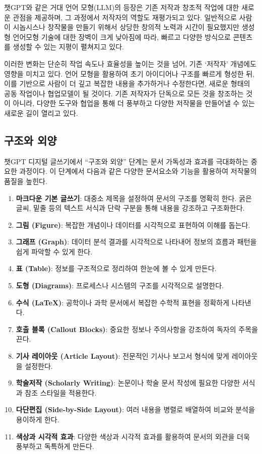 \documentclass[
  letterpaper,
]{book}
\providecommand{\tightlist}{%
  \setlength{\itemsep}{0pt}\setlength{\parskip}{0pt}}\usepackage{longtable,booktabs,array}
\begin{document}
챗GPT와 같은 거대 언어 모형(LLM)의 등장은 기존 저작과 창조적 작업에 대한
새로운 관점을 제공하며, 그 과정에서 저작자의 역할도 재평가되고 있다.
일반적으로 사람이 시놉시스나 창작물을 만들기 위해서 상당한 창의적 노력과
시간이 필요했지만 생성형 언어모형 기술에 대한 장벽이 크게 낮아짐에 따라,
빠르고 다양한 방식으로 콘텐츠를 생성할 수 있는 지평이 펼쳐지고 있다.

이러한 변화는 단순히 작업 속도나 효율성을 높이는 것을 넘어, 기존
`저작자' 개념에도 영향을 미치고 있다. 언어 모형을 활용하여 초기
아이디어나 구조를 빠르게 형성한 뒤, 이를 기반으로 사람이 더 깊고 복잡한
내용을 추가하거나 수정한다면, 새로운 형태의 공동 작업이나 협업모델이 될
것이다. 기존 저작자가 단독으로 모든 것을 창조하는 것이 아니라, 다양한
도구와 협업을 통해 더 풍부하고 다양한 저작물을 만들어낼 수 있는 새로운
길이 열리고 있다.

\hypertarget{uxad6cuxc870uxc640-uxc678uxc591}{%
\subsection{구조와 외양}\label{uxad6cuxc870uxc640-uxc678uxc591}}

챗GPT 디지털 글쓰기에서 ``구조와 외양'' 단계는 문서 가독성과 효과를
극대화하는 중요한 과정이다. 이 단계에서 다음과 같은 다양한 문서요소와
기능을 활용하여 저작물의 품질을 높힌다.

\begin{enumerate}
\def\labelenumi{\arabic{enumi}.}
\tightlist
\item
  \textbf{마크다운 기본 글쓰기}: 대중소 제목을 설정하여 문서의 구조를
  명확히 한다. 굵은 글씨, 밑줄 등의 텍스트 서식과 단락 구분을 통해
  내용을 강조하고 구조화한다.
\item
  \textbf{그림 (Figure)}: 복잡한 개념이나 데이터를 시각적으로 표현하여
  이해를 돕는다.
\item
  \textbf{그래프 (Graph)}: 데이터 분석 결과를 시각적으로 나타내어 정보의
  흐름과 패턴을 쉽게 파악할 수 있게 한다.
\item
  \textbf{표 (Table)}: 정보를 구조적으로 정리하여 한눈에 볼 수 있게
  만든다.
\item
  \textbf{도형 (Diagrams)}: 프로세스나 시스템의 구조를 시각적으로
  설명한다.
\item
  \textbf{수식 (LaTeX)}: 공학이나 과학 문서에서 복잡한 수학적 표현을
  정확하게 나타낸다.
\item
  \textbf{호출 블록 (Callout Blocks)}: 중요한 정보나 주의사항을 강조하여
  독자의 주목을 끈다.
\item
  \textbf{기사 레이아웃 (Article Layout)}: 전문적인 기사나 보고서 형식에
  맞게 레이아웃을 설정한다.
\item
  \textbf{학술저작 (Scholarly Writing)}: 논문이나 학술 문서 작성에
  필요한 다양한 서식과 참조 스타일을 적용한다.
\item
  \textbf{다단편집 (Side-by-Side Layout)}: 여러 내용을 병렬로 배열하여
  비교와 분석을 용이하게 한다.
\item
  \textbf{색상과 시각적 효과}: 다양한 색상과 시각적 효과를 활용하여
  문서의 외관을 더욱 풍부하고 독특하게 만든다.
\end{enumerate}
\end{document}
